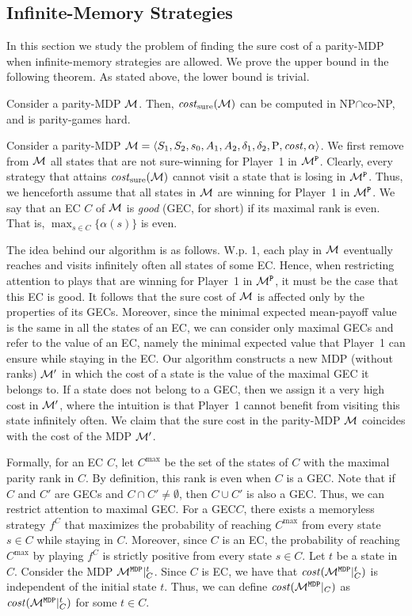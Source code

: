 \documentclass[runningheads,a4paper]{llncs}
\newcommand{\set}[1]{{\{#1\}}}
\newcommand{\zug}[1]{\langle #1  \rangle}
\newcommand{\M}{{\cal M}}
\renewcommand{\P}{{\mathtt P}}
\newcommand{\MDP}{{\mathtt{MDP}}}
\newcommand{\cost}{{\it cost}}
\newcommand{\Act}{A}
\newcommand{\MDPProb}{{\rm P}}
\newcommand{\MDPcost}{{\it cost}}
\newcommand{\costs}{{\it cost}_{\rm sure}}
\newcommand{\gec}{{GEC}\xspace}
\newcommand{\gecs}{{GECs}\xspace}
\begin{document}
\vspace*{-8pt}
\subsection{Infinite-Memory Strategies}
\label{sec:infinite memory}
In this section we study the problem of finding the sure cost of a parity-MDP when infinite-memory strategies are allowed. 
We prove the upper bound in the following theorem. As stated above, the lower bound is trivial.

\begin{theorem}
\label{thm:parityMDP infinite NP cap co-NP}
Consider a parity-MDP $\M$. Then, $\costs(\M)$ can be computed in NP$\cap$co-NP, and is parity-games hard.
\end{theorem}

 
Consider a parity-MDP $\M=\zug{S_1,S_2,s_0,\Act_1,\Act_2,\delta_1, \delta_2,\MDPProb,\MDPcost,\alpha}$.
We first remove from $\M$ all states that are not sure-winning for Player~1 in $\M^{\P}$. Clearly, every strategy that attains $\costs(\M)$ cannot visit a state that is losing in  $\M^{\P}$. Thus, we henceforth assume that all states in $\M$ are winning for Player~1 in $\M^{\P}$. 
We say that an EC $C$ of $\M$ is {\em good} (\gec, for short) if its maximal rank is even. That is, $\max_{s\in C}\set{\alpha(s)}$ is even. 

The idea behind our algorithm is as follows. W.p. 1, each play in $\M$ eventually reaches and visits infinitely often all states of some EC. Hence, when restricting attention to plays that are winning for Player~1 in $\M^{\P}$, it must be the case that this EC is good. It follows that the sure cost of $\M$ is affected only by the properties of its \gecs.
Moreover, since  the minimal expected mean-payoff value is the same in all the states of an EC, we can consider only maximal \gecs and refer to the value of an EC, namely the minimal expected value that Player~1 can ensure while staying in the EC. Our algorithm constructs a new MDP (without ranks) $\M'$ in which the cost of a state is the value of the maximal \gec it belongs to. If a state does not belong to a \gec, then we assign it a very high cost in $\M'$, where the intuition is that Player~1 cannot benefit from visiting this state infinitely often. We claim that the sure cost in the parity-MDP $\M$  coincides with the cost of the MDP $\M'$.

Formally, for an EC $C$, let $C^{\max}$ be the set of the states of $C$ with the maximal parity rank in $C$. By definition, this rank is even when $C$ is a \gec. 
Note that if $C$ and $C'$ are \gecs and $C\cap C'\neq \emptyset$, then $C\cup C'$ is also a \gec. Thus, we can restrict attention to maximal \gec.
For a \gec $C$, there exists a memoryless strategy $f^C$ that maximizes the probability of reaching $C^{\max}$ from every state $s\in C$ while staying in $C$. Moreover, since $C$ is an EC, the probability of reaching $C^{\max}$ by playing $f^C$ is strictly positive from every state $s\in C$. Let $t$ be a state in $C$. Consider the MDP $\M^{\MDP}|^t_C$. 
Since $C$ is EC, we have that $\cost(\M^{\MDP}|^t_C)$ is independent of the initial state $t$. Thus, we can define $\cost(\M^{\MDP}|_C)$ as $\cost(\M^{\MDP}|_C^t)$ for some $t\in C$.
\end{document}
